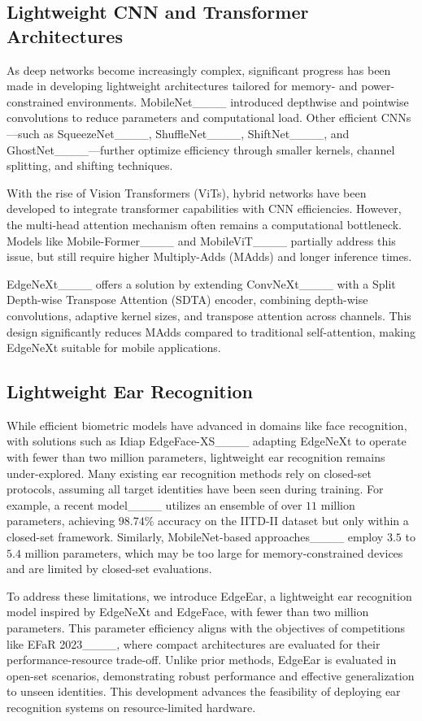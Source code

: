 \subsection{Lightweight CNN and Transformer Architectures}
As deep networks become increasingly complex, significant progress has been made in developing lightweight architectures tailored for memory- and power-constrained environments. MobileNet____ introduced depthwise and pointwise convolutions to reduce parameters and computational load. Other efficient CNNs—such as SqueezeNet____, ShuffleNet____, ShiftNet____, and GhostNet____—further optimize efficiency through smaller kernels, channel splitting, and shifting techniques.

With the rise of Vision Transformers (ViTs), hybrid networks have been developed to integrate transformer capabilities with CNN efficiencies. However, the multi-head attention mechanism often remains a computational bottleneck. Models like Mobile-Former____ and MobileViT____ partially address this issue, but still require higher Multiply-Adds (MAdds) and longer inference times.

EdgeNeXt____ offers a solution by extending ConvNeXt____ with a Split Depth-wise Transpose Attention (SDTA) encoder, combining depth-wise convolutions, adaptive kernel sizes, and transpose attention across channels. This design significantly reduces MAdds compared to traditional self-attention, making EdgeNeXt suitable for mobile applications.


\subsection{Lightweight Ear Recognition}

While efficient biometric models have advanced in domains like face recognition, with solutions such as Idiap EdgeFace-XS____ adapting EdgeNeXt to operate with fewer than two million parameters, lightweight ear recognition remains under-explored. Many existing ear recognition methods rely on closed-set protocols, assuming all target identities have been seen during training. For example, a recent model____ utilizes an ensemble of over $11$ million parameters, achieving $98.74\%$ accuracy on the IITD-II dataset but only within a closed-set framework. Similarly, MobileNet-based approaches____ employ $3.5$ to $5.4$ million parameters, which may be too large for memory-constrained devices and are limited by closed-set evaluations.

To address these limitations, we introduce EdgeEar, a lightweight ear recognition model inspired by EdgeNeXt and EdgeFace, with fewer than two million parameters. This parameter efficiency aligns with the objectives of competitions like EFaR 2023____, where compact architectures are evaluated for their performance-resource trade-off. Unlike prior methods, EdgeEar is evaluated in open-set scenarios, demonstrating robust performance and effective generalization to unseen identities. This development advances the feasibility of deploying ear recognition systems on resource-limited hardware.



